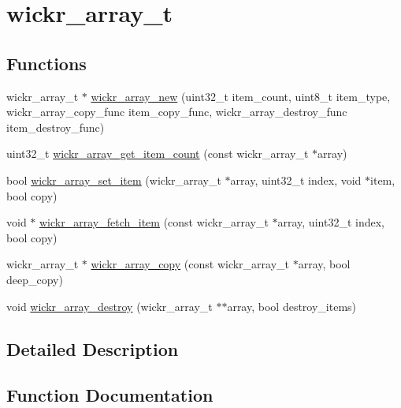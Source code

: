 \hypertarget{group__wickr__array}{}\section{wickr\+\_\+array\+\_\+t}
\label{group__wickr__array}
\subsection*{Functions}
\begin{DoxyCompactItemize}
\item 
wickr\+\_\+array\+\_\+t $\ast$ \hyperlink{group__wickr__array_gad5842105c20b42cc4b5b4ffc2a72556b}{wickr\+\_\+array\+\_\+new} (uint32\+\_\+t item\+\_\+count, uint8\+\_\+t item\+\_\+type, wickr\+\_\+array\+\_\+copy\+\_\+func item\+\_\+copy\+\_\+func, wickr\+\_\+array\+\_\+destroy\+\_\+func item\+\_\+destroy\+\_\+func)
\item 
uint32\+\_\+t \hyperlink{group__wickr__array_gafe1191ce494529dbfd5240a84bcba5a2}{wickr\+\_\+array\+\_\+get\+\_\+item\+\_\+count} (const wickr\+\_\+array\+\_\+t $\ast$array)
\item 
bool \hyperlink{group__wickr__array_ga3b3c15b3c6a15f52d20c678b6829ee21}{wickr\+\_\+array\+\_\+set\+\_\+item} (wickr\+\_\+array\+\_\+t $\ast$array, uint32\+\_\+t index, void $\ast$item, bool copy)
\item 
void $\ast$ \hyperlink{group__wickr__array_ga3a6dd3ee6295f6230e2047584a261774}{wickr\+\_\+array\+\_\+fetch\+\_\+item} (const wickr\+\_\+array\+\_\+t $\ast$array, uint32\+\_\+t index, bool copy)
\item 
wickr\+\_\+array\+\_\+t $\ast$ \hyperlink{group__wickr__array_ga1e28a815bd4310985e493b67f66f26c7}{wickr\+\_\+array\+\_\+copy} (const wickr\+\_\+array\+\_\+t $\ast$array, bool deep\+\_\+copy)
\item 
void \hyperlink{group__wickr__array_ga984338e0a278ef1b23aca7330f0bfcc3}{wickr\+\_\+array\+\_\+destroy} (wickr\+\_\+array\+\_\+t $\ast$$\ast$array, bool destroy\+\_\+items)
\end{DoxyCompactItemize}


\subsection{Detailed Description}


\subsection{Function Documentation}
\mbox{\label{group__wickr__array_ga1e28a815bd4310985e493b67f66f26c7}} 
